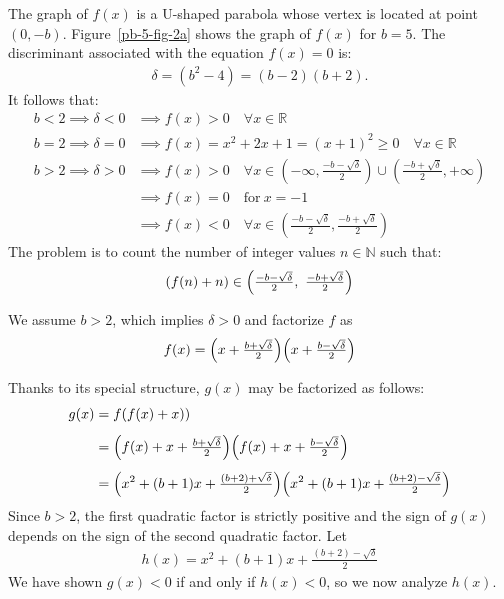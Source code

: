 The graph of $f(x)$ is a U-shaped parabola whose vertex is located at point $(0,-b)$. Figure~\ref{pb-5-fig-2a} shows the graph of $f(x)$ for $b=5$. The discriminant associated with the equation $f(x)=0$ is: 
\begin{align*}
\delta = (b^{2}-4)=(b-2)(b+2). 
\end{align*}
It follows that:
\begin{align*}
b < 2 \implies \delta < 0 
     &\implies f(x) > 0 \quad \forall x \in \mathbb{R}
\\
b = 2 \implies \delta = 0 
     &\implies f(x) = x^{2} + 2x + 1 = (x+1)^{2} \ge 0 \quad \forall x \in \mathbb{R}
\\
b > 2 \implies \delta > 0 
     &\implies f(x) > 0 \quad \forall x \in (-\infty, \tfrac{-b-\sqrt{\delta}}{2}) \cup (\tfrac{-b+\sqrt{\delta}}{2}, +\infty)
\\
     &\implies f(x) = 0 \quad \text{for}~ x = -1
\\
     &\implies f(x) < 0 \quad \forall x \in (\tfrac{-b-\sqrt{\delta}}{2}, \tfrac{-b+\sqrt{\delta}}{2})
\end{align*}
The problem is to count the number of integer values $n\in\mathbb{N}$ such that:
\begin{align*}
(f(n) + n) \in  
  \Bigl(\tfrac{-b-\sqrt{\delta}}{2},\
        \tfrac{-b+\sqrt{\delta}}{2}
   \Bigr)
\end{align*}

We assume $b>2$, which implies $\delta>0$ and factorize $f$ as
\begin{align*}
f(x) = \Bigl(x+\tfrac{b+\sqrt{\delta}}{2}\Bigr)\Bigl(x+\tfrac{b-\sqrt{\delta}}{2}\Bigr)
\end{align*}

Thanks to its special structure, $g(x)$ may be factorized as follows:
\begin{align*}
g(x) 
& = f(f(x)+x))
\\[1ex]
& = \Bigl(f(x)+x+\tfrac{b+\sqrt{\delta}}{2}\Bigr) 
    \Bigl(f(x)+x+\tfrac{b-\sqrt{\delta}}{2}\Bigr)
\\[1ex]
& = \Bigl(x^{2}+(b+1)x + \tfrac{(b+2) + \sqrt{\delta}}{2}\Bigr) 
    \Bigl(x^{2}+(b+1)x + \tfrac{(b+2) - \sqrt{\delta}}{2}\Bigr)
\end{align*}
Since $b>2$, the first quadratic factor is strictly positive and the sign of $g(x)$ depends on the sign of the second quadratic factor. Let 
\begin{align*}
h(x) = x^{2}+(b+1)x+\tfrac{(b+2)-\sqrt{\delta}}{2}
\end{align*}
We have shown $g(x)<0$ if and only if $h(x)<0$, so we now analyze $h(x)$.

